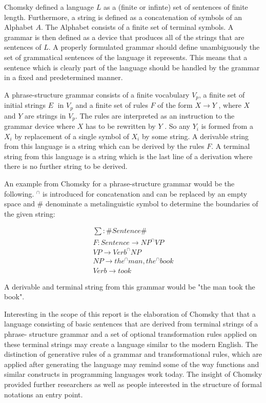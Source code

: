 \documentclass{article}
\begin{document}
Chomsky defined a language $L$ as a (finite or infinte) set of sentences of finite length. Furthermore, a string is defined as a concatenation of symbols of an Alphabet $A$. The Alphabet consists of a finite set of terminal symbols. A grammar is then defined as a device that produces all of the strings that are sentences of $L$. A properly formulated grammar should define unambiguously the set of grammatical sentences of the language it represents. This means that a sentence which is clearly part of the language should be handled by the grammar in a fixed and predetermined manner.

A phrase-structure grammar consists of a finite vocabulary $V_p$, a finite set of initial strings $E$􏰀 in $V_p$ and a finite set of rules $F$ of the form $X \to Y$ , where $X$ and $Y$ are strings in $V_p$. The rules are interpreted as an instruction to the grammar device where $X$ has to be rewritten by $Y$ . So any $Y_i$ is formed from a $X_i$ by replacement of a single symbol of $X_i$ by some string. A derivable string from this language is a string which can be derived by the rules $F$. A terminal string from this language is a string which is the last line of a derivation where there is no further string to be derived.

An example from Chomsky for a phrase-structure grammar would be the following. $^{\cap}$ is introduced for concatenation and can be replaced by an empty space and \# denominate a metalinguistic symbol to determine the boundaries of the given string:

\begin{align*}
	\sum : \# Sentence \# \\
	F: Sentence \to NP^{\cap}VP \\
	VP \to Verb^{\cap}NP \\
	NP \to the^{\cap}man, the^{\cap}book \\
	Verb \to took
\end{align*}

A derivable and terminal string from this grammar would be "the man took the book".

Interesting in the scope of this report is the elaboration of Chomsky that that a language consisting of basic sentences that are derived from terminal strings of a phrase- structure grammar and a set of optional transformation rules applied on these terminal strings may create a language similar to the modern English. The distinction of generative rules of a grammar and transformational rules, which are applied after generating the language may remind some of the way functions and similar constructs in programming languages work today. The insight of Chomsky provided further researchers as well as people interested in the structure of formal notations an entry point.
\end{document}
